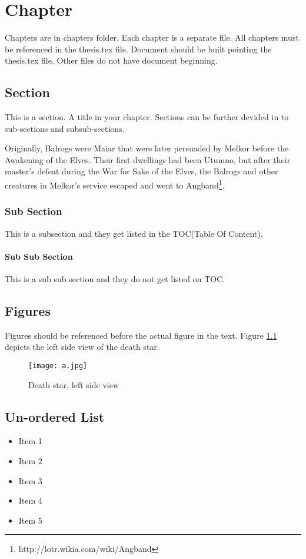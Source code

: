 \chapter{Chapter}
Chapters are in chapters folder. Each chapter is a separate file. All chapters must be referenced in the thesis.tex file. Document should be built pointing the thesis.tex file. Other files do not have document beginning.
\section{Section}
This is a section. A title in your chapter. Sections can be further devided in to sub-sections and subsub-sections.

Originally, Balrogs were Maiar that were later persuaded by Melkor before the Awakening of the Elves. Their first dwellings had been Utumno, but after their master's defeat during the War for Sake of the Elves, the Balrogs and other creatures in Melkor's service escaped and went to Angband\footnote{http://lotr.wikia.com/wiki/Angband}.
\subsection{Sub Section}
	This is a subsection and they get listed in the TOC(Table Of Content).
\subsubsection{Sub Sub Section}
	This is a sub sub section and they do not get listed on TOC.	
\section{Figures}
Figures should  be referenced before the actual figure in the text. Figure \ref{bounding} depicts the left side view of the death star. 
	\begin{figure}[H]
		\texttt{[image: a.jpg]}
		\centering
		\caption{Death star, left side view}
		\label{bounding}
	\end{figure}

\section{Un-ordered List}
	
\begin{itemize}
	\item Item 1
	\item Item 2
	\item Item 3
	\item Item 4
	\item Item 5
\end{itemize}

